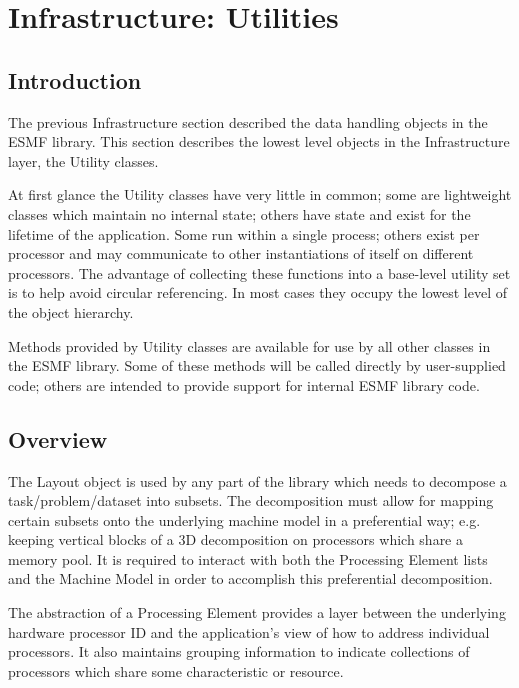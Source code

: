 \section{Infrastructure: Utilities}
\label{sec:utilclasses}

\subsection{Introduction}

The previous Infrastructure section described the data handling 
objects in the ESMF library. This section describes the lowest level
objects in the Infrastructure layer, the Utility classes.

At first glance the Utility classes have very little in common;
some are lightweight classes which maintain no internal state; 
others have state and exist for the lifetime of the application.  
Some run within a single process; others exist per processor and 
may communicate to other instantiations of itself on different processors.
The advantage of collecting these functions 
into a base-level utility set is to help avoid circular referencing.
In most cases they occupy the lowest level of the object hierarchy.

Methods provided by Utility classes are available for use by  
all other classes in the ESMF library.  
Some of these methods will be called directly by user-supplied
code; others are intended to provide support for internal ESMF 
library code.

\subsection{Overview}

The Layout object is used by any part of the library which needs
to decompose a task/problem/dataset into subsets.
The decomposition must allow for mapping certain subsets onto the
underlying machine model in a preferential way; e.g. keeping
vertical blocks of a 3D decomposition on processors which share
a memory pool.
It is required to interact with both the Processing Element lists
and the Machine Model in order to accomplish this preferential
decomposition.

The abstraction of a Processing Element provides a layer between
the underlying hardware processor ID and the application's view
of how to address individual processors.  It also maintains
grouping information to indicate collections of processors which
share some characteristic or resource.

